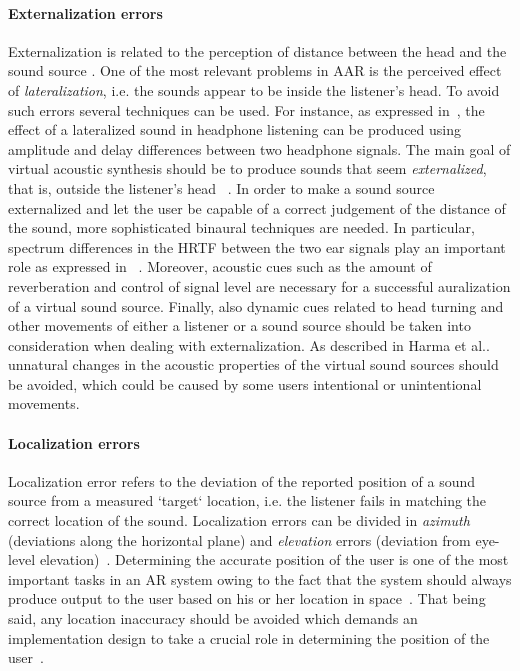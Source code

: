 \documentclass[journal]{IEEEtran}
\begin{document}
\paragraph{Externalization errors}
Externalization is related to the perception of distance between the head and the sound source \cite{Tame2012}. One of the most relevant problems in AAR is the perceived effect of \emph{lateralization}, i.e. the sounds appear to be inside the listener's head. To avoid such errors several techniques can be used. For instance, as expressed in~\cite{harma2004}, the effect of a lateralized sound in headphone listening can be produced using amplitude and delay differences between two headphone signals. The main goal of virtual acoustic synthesis should be to produce sounds that seem \emph{externalized}, that is, outside the listener's head ~\cite{begault2001}. In order to make a sound source externalized and let the user be capable of a correct judgement of the distance of the sound, more sophisticated binaural techniques are needed. In particular, spectrum differences in the HRTF between the two ear signals play an important role as expressed in ~\cite{harma2004}. Moreover, acoustic cues such as the amount of reverberation and control of signal level are necessary for a successful auralization of a virtual sound source. Finally, also dynamic cues related to head turning and other movements of either a listener or a sound source should be taken into consideration when dealing with externalization. As described in Harma et al..~\cite{harma2004} unnatural changes in the acoustic properties of the virtual sound sources should be avoided, which could be caused by some users intentional or unintentional movements.

\paragraph{Localization errors}
Localization error refers to the deviation of the reported position of a sound source from a measured `target` location, i.e. the listener fails in matching the correct location of the sound. Localization errors can be divided in \emph{azimuth} (deviations along the horizontal plane) and \emph{elevation} errors (deviation from eye-level elevation)~\cite{begault2001}. Determining the accurate position of the user is one of the most important tasks in an AR system owing to the fact that the system should always produce output to the user based on his or her location in space~\cite{rozier2000}. That being said, any location inaccuracy should be avoided which demands an implementation design to take a crucial role in determining the position of the user~\cite{alvarez2011}.
\end{document}
